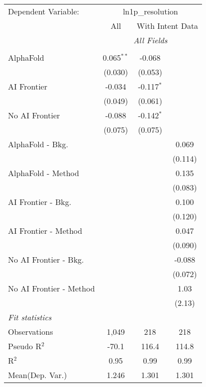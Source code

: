 \begingroup
\centering
\begin{tabular}{lccc}
   \tabularnewline \midrule \midrule
   Dependent Variable: & \multicolumn{3}{c}{ln1p\_resolution}\\
 & \multicolumn{1}{c}{All} & \multicolumn{2}{c}{With Intent Data} \\
\cmidrule(lr){2-2} \cmidrule(lr){3-4}
 & \multicolumn{3}{c}{\textit{All Fields}} \\ \\
   AlphaFold               & 0.065$^{**}$ & -0.068       &   \\   
                           & (0.030)      & (0.053)      &   \\   
   AI Frontier             & -0.034       & -0.117$^{*}$ &   \\   
                           & (0.049)      & (0.061)      &   \\   
   No AI Frontier          & -0.088       & -0.142$^{*}$ &   \\   
                           & (0.075)      & (0.075)      &   \\   
   AlphaFold - Bkg.        &              &              & 0.069\\   
                           &              &              & (0.114)\\   
   AlphaFold - Method      &              &              & 0.135\\   
                           &              &              & (0.083)\\   
   AI Frontier - Bkg.      &              &              & 0.100\\   
                           &              &              & (0.120)\\   
   AI Frontier - Method    &              &              & 0.047\\   
                           &              &              & (0.090)\\   
   No AI Frontier - Bkg.   &              &              & -0.088\\   
                           &              &              & (0.072)\\   
   No AI Frontier - Method &              &              & 1.03\\   
                           &              &              & (2.13)\\   
   \midrule
   \emph{Fit statistics}\\
   Observations            & 1,049        & 218          & 218\\  
   Pseudo R$^2$            & -70.1        & 116.4        & 114.8\\  
   R$^2$                   & 0.95         & 0.99         & 0.99\\  
Mean(Dep. Var.) & 1.246 & 1.301 & 1.301 \\
   

\end{tabular}
